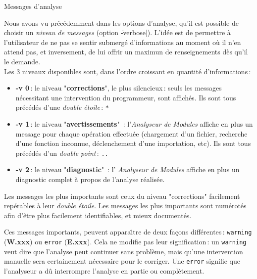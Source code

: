  {Messages d'analyse}

Nous avons vu pr\'{e}c\'{e}demment dans les options d'analyse, qu'il est
possible de choisir un {\it niveau de messages} (option
\|-verbose|). L'id\'{e}e est de 
permettre \`{a} l'utilisateur de ne pas se sentir submerg\'{e}
d'informations au moment o\`{u} il n'en attend pas, et inversement, de
lui offrir un maximun de renseignements d\`{e}s qu'il le demande. \\
Les 3 niveaux disponibles sont, dans l'ordre croissant en quantit\'{e}
d'informations\,: 
\begin{itemize}
\item {\Large {\bf -v 0}}\,: le niveau "{\bf corrections}", le plus
silencieux\,: seuls les
messages n\'{e}cessitant une 
intervention du programmeur, sont affich\'{e}s. Ils sont tous pr\'{e}c\'{e}d\'{e}s
d'une  {\em double \'{e}toile}\,: {\tt **}
\item {\Large {\bf -v 1}}\,: le niveau "{\bf avertissements}"\ :
l'{\em Analyseur de Modules} 
affiche en plus un
message pour chaque op\'{e}ration effectu\'{e}e (chargement d'un
fichier, recherche d'une fonction inconnue, d\'{e}clenchement d'une
importation, etc). Ils sont tous pr\'{e}c\'{e}d\'{e}s
d'un  {\em double point}\,: {\tt ..}
\item {\Large {\bf -v 2}}\,: le niveau "{\bf diagnostic}"\ : l'{\em
Analyseur de Modules} affiche 
en plus un diagnostic complet \`{a} propos de l'analyse r\'{e}alis\'{e}e.
\end{itemize}

Les messages les plus importants sont ceux du niveau "corrections"
facilement rep\'{e}rables \`{a} leur {\em double
\'{e}toile}. Les messages les plus importants sont num\'{e}rot\'{e}s afin
d'\^{e}tre plus facilement identifiables, et mieux document\'{e}s.

Ces messages importants, peuvent appara\^{\i}tre de deux fa\c{c}ons
diff\'{e}rentes\,: {\tt warning} ({\bf W.xxx}) ou {\tt error} ({\bf E.xxx}).
Cela ne modifie pas leur signification\,: un {\tt warning} veut
dire que l'analyse peut continuer sans probl\`{e}me, mais qu'une
intervention manuelle sera certainement n\'{e}cessaire pour le corriger.
Une {\tt error} signifie que l'analyseur a d\^{u} interrompre 
l'analyse en partie ou compl\`{e}tement.

